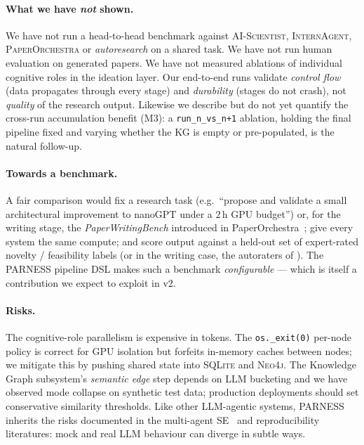 \documentclass{article}
\newcommand{\parness}{\textsf{PARNESS}}
\newcommand{\code}[1]{\texttt{\small #1}}
\begin{document}
\paragraph{What we have \emph{not} shown.}
We have not run a head-to-head benchmark against \textsc{AI-Scientist},
\textsc{InternAgent}, \textsc{PaperOrchestra} or \emph{autoresearch} on a
shared task. We have not run human evaluation on generated papers. We
have not measured ablations of individual cognitive roles in the
ideation layer. Our end-to-end runs validate \emph{control flow} (data
propagates through every stage) and \emph{durability} (stages do not
crash), not \emph{quality} of the research output. Likewise we describe
but do not yet quantify the cross-run accumulation benefit (M3): a
\code{run\_n\_vs\_n+1} ablation, holding the final pipeline fixed and
varying whether the KG is empty or pre-populated, is the natural
follow-up.

\paragraph{Towards a benchmark.}
A fair comparison would fix a research task (e.g.\ ``propose and validate
a small architectural improvement to nanoGPT under a $2$\,h GPU budget'')
or, for the writing stage, the \emph{PaperWritingBench} introduced in
PaperOrchestra~\cite{paperorchestra}; give every system the same compute;
and score output against a held-out set of expert-rated novelty /
feasibility labels (or in the writing case, the autoraters of
\cite{paperorchestra}). The \parness{} pipeline DSL makes such a
benchmark \emph{configurable} --- which is itself a contribution we
expect to exploit in v2.

\paragraph{Risks.}
The cognitive-role parallelism is expensive in tokens. The
\code{os.\_exit(0)} per-node policy is correct for GPU isolation but
forfeits in-memory caches between nodes; we mitigate this by pushing
shared state into \textsc{SQLite} and \textsc{Neo4j}. The Knowledge
Graph subsystem's \emph{semantic edge} step depends on LLM bucketing and
we have observed mode collapse on synthetic test data; production
deployments should set conservative similarity thresholds. Like other
LLM-agentic systems, \parness{} inherits the risks documented in the
multi-agent SE~\cite{multiagentse} and reproducibility~\cite{leakageml}
literatures: mock and real LLM behaviour can diverge in subtle ways.
\end{document}
